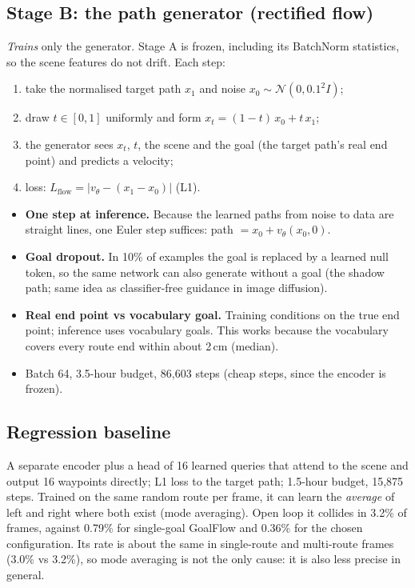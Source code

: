 \documentclass[11pt,a4paper]{article}
\begin{document}
\subsection{Stage B: the path generator (rectified flow)}
\textit{Trains} only the generator. Stage A is frozen, including its BatchNorm statistics, so the scene
features do not drift. Each step:
\begin{enumerate}[nosep]
  \item take the normalised target path $x_1$ and noise $x_0\sim\mathcal{N}(0,0.1^2 I)$;
  \item draw $t\in[0,1]$ uniformly and form $x_t=(1-t)\,x_0+t\,x_1$;
  \item the generator sees $x_t$, $t$, the scene and the goal (the target path's real end point) and
        predicts a velocity;
  \item loss: $L_{\text{flow}} = \lvert v_\theta - (x_1-x_0)\rvert$ (L1).
\end{enumerate}
\begin{itemize}
  \item \textbf{One step at inference.} Because the learned paths from noise to data are straight lines,
        one Euler step suffices: path $= x_0 + v_\theta(x_0, 0)$.
  \item \textbf{Goal dropout.} In 10\% of examples the goal is replaced by a learned null token, so the same
        network can also generate without a goal (the shadow path; same idea as classifier-free guidance in
        image diffusion).
  \item \textbf{Real end point vs vocabulary goal.} Training conditions on the true end point; inference
        uses vocabulary goals. This works because the vocabulary covers every route end within about 2\,cm
        (median).
  \item Batch 64, 3.5-hour budget, 86{,}603 steps (cheap steps, since the encoder is frozen).
\end{itemize}

\subsection{Regression baseline}
A separate encoder plus a head of 16 learned queries that attend to the scene and output 16 waypoints
directly; L1 loss to the target path; 1.5-hour budget, 15{,}875 steps. Trained on the same random route per
frame, it can learn the \emph{average} of left and right where both exist (mode averaging). Open loop it
collides in 3.2\% of frames, against 0.79\% for single-goal GoalFlow and 0.36\% for the chosen configuration.
Its rate is about the same in single-route and multi-route frames (3.0\% vs 3.2\%), so mode averaging is not
the only cause: it is also less precise in general.
\end{document}

